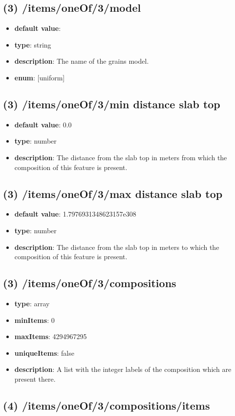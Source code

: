 \subsection{(3) /items/oneOf/3/model}
\begin{itemize}[leftmargin=3em]\item {\bf default value}: 
\item {\bf type}: string
\item {\bf description}: The name of the grains model.
\item {\bf enum}: [uniform]\end{itemize}\subsection{(3) /items/oneOf/3/min distance slab top}
\begin{itemize}[leftmargin=3em]\item {\bf default value}: 0.0
\item {\bf type}: number
\item {\bf description}: The distance from the slab top in meters from which the composition of this feature is present.
\end{itemize}\subsection{(3) /items/oneOf/3/max distance slab top}
\begin{itemize}[leftmargin=3em]\item {\bf default value}: 1.7976931348623157e308
\item {\bf type}: number
\item {\bf description}: The distance from the slab top in meters to which the composition of this feature is present.
\end{itemize}\subsection{(3) /items/oneOf/3/compositions}
\begin{itemize}[leftmargin=3em]\item {\bf type}: array
\item {\bf minItems}: 0
\item {\bf maxItems}: 4294967295
\item {\bf uniqueItems}: false
\item {\bf description}: A list with the integer labels of the composition which are present there.
\end{itemize}\subsection{(4) /items/oneOf/3/compositions/items}
